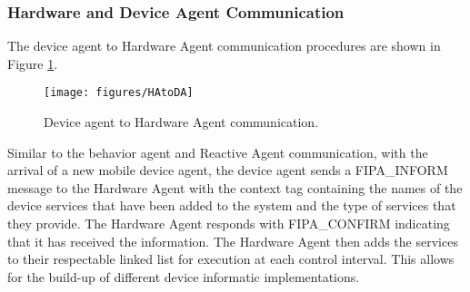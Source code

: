     \subsubsection{Hardware and Device Agent Communication}
      The device agent to Hardware Agent communication procedures are shown in 
        Figure \ref{fig:hatoda}.
      \begin{figure}%
        \centerline{\texttt{[image: figures/HAtoDA]}}
        \caption{Device agent to Hardware Agent communication.}
        \label{fig:hatoda}
      \end{figure}
      Similar to the behavior agent and Reactive Agent communication, with the 
        arrival of a new mobile device agent, the device agent sends a 
        FIPA\_INFORM message to the Hardware Agent with the context tag 
        containing the names of the device services that have been added to the 
        system and the type of services that they provide.
      The Hardware Agent responds with FIPA\_CONFIRM indicating that it has 
        received the information.
      The Hardware Agent then adds the services to their respectable linked list
        for execution at each control interval.
      This allows for the build-up of different device informatic 
        implementations.


